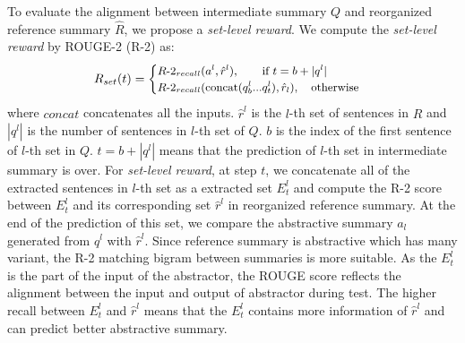 To evaluate the alignment between intermediate summary $Q$ and 
reorganized reference summary $\hat{R}$, we propose a {\em set-level reward}.
We compute the {\em set-level reward} by ROUGE-2 (R-2) as:
\begin{equation}
\small
R_{set}(t) = 
	\begin{cases}
		   \mbox{$R$-$2_{recall}(a^l,\hat{r}^l)$}, \quad \quad \mbox{if $t=b+|q^l|$}\\
           \mbox{$R$-}2_{recall}(\mbox{concat}(q_b^l...q_t^l),\hat{r}_l), \quad    \mbox{otherwise}\\
   \end{cases}
\end{equation}
where $concat$ concatenates all the inputs.
$\hat{r}^l$ is the $l$-th set of sentences in $\hat{R}$ and $|q^l|$ is the number of sentences in $l$-th set of $Q$.
$b$ is the index of the first sentence of $l$-th set in $Q$.
$t=b+|q^l|$ means that the prediction of $l$-th set in intermediate summary is over.
For {\em set-level reward}, at step $t$, we concatenate all of the extracted sentences in $l$-th set as a extracted set $E_t^l$ 
and compute the R-2 score between $E^l_t$ and its corresponding set $\hat{r}^l$ in reorganized reference summary.
At the end of the prediction of this set, we compare the abstractive summary $a_l$ generated from $q^l$ with $\hat{r}^l$.
Since reference summary is abstractive which has many variant, the R-2 matching bigram between summaries is more suitable.
As the $E_t^l$ is the part of the input of the abstractor, the ROUGE score reflects the alignment between the input and output of abstractor 
during test.
The higher recall between $E_t^l$ and $\hat{r}^l$
means that the $E_t^l$ contains more information of $\hat{r}^l$ and can predict better abstractive summary.


